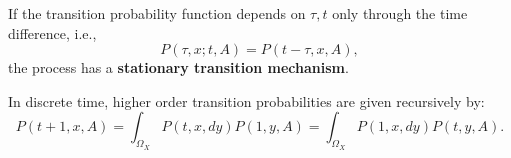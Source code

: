 If the transition probability function depends on $\tau, t$ only through the time difference, i.e.,
$$P(\tau, x; t, A) = P(t - \tau, x, A),$$
the process has a \textbf{stationary transition mechanism}.

In discrete time, higher order transition probabilities are given recursively by:
$$P(t+1, x, A) = \int_{\Omega_X} P(t, x, dy) P(1, y, A) = \int_{\Omega_X} P(1, x, dy) P(t, y, A).$$
